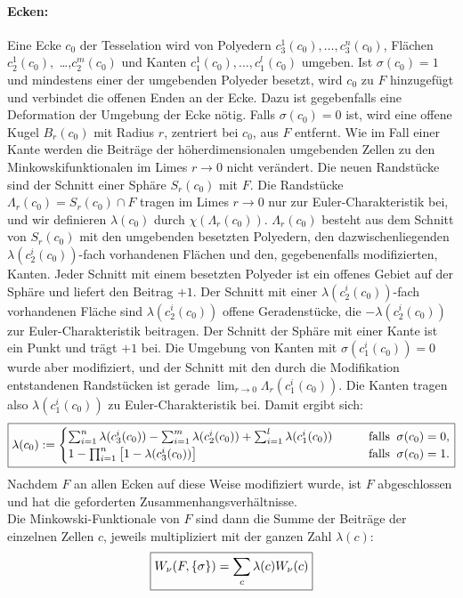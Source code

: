 \paragraph{Ecken:} Eine Ecke $c_0$ der Tesselation wird von Polyedern $c_3^1(c_0),\ldots,c_3^n(c_0)$, Fl\"achen $c_2^1(c_0),$ \ldots,$c_2^m(c_0)$ und Kanten $c_1^1(c_0),\ldots,c_1^l(c_0)$ umgeben. Ist $\sigma(c_0)=1$ und mindestens einer der umgebenden Polyeder besetzt, wird $c_0$ zu $F$ hinzugef\"ugt und verbindet die offenen Enden an der Ecke. Dazu ist gegebenfalls eine Deformation der Umgebung der Ecke n\"otig. Falls $\sigma(c_0)=0$ ist, wird eine offene Kugel $B_r(c_0)$ mit Radius $r$, zentriert bei $c_0$, aus $F$ entfernt. Wie im Fall einer Kante werden die Beitr\"age der h\"oherdimensionalen umgebenden Zellen zu den Minkowskifunktionalen im Limes $r\rightarrow 0$ nicht ver\"andert. Die neuen Randst\"ucke sind der Schnitt einer Sph\"are $S_r(c_0)$ mit $F$. Die Randst\"ucke $\Lambda_r(c_0)=S_r(c_0)\cap F$ tragen im Limes $r\rightarrow 0$ nur zur Euler-Charakteristik bei, und wir definieren $\lambda(c_0)$ durch $\chi(\Lambda_r(c_0))$. $\Lambda_r(c_0)$ besteht aus dem Schnitt von $S_r(c_0)$ mit den umgebenden besetzten Polyedern, den dazwischenliegenden $\lambda(c_2^i(c_0))$-fach vorhandenen Fl\"achen und den, gegebenenfalls modifizierten, Kanten. Jeder Schnitt mit einem besetzten Polyeder ist ein offenes Gebiet auf der Sph\"are und liefert den Beitrag $+1$. Der Schnitt mit einer $\lambda(c_2^i(c_0))$-fach vorhandenen Fl\"ache sind $\lambda(c_2^i(c_0))$ offene Geradenst\"ucke, die $-\lambda(c_2^i(c_0))$ zur Euler-Charakteristik beitragen. Der Schnitt der Sph\"are mit einer Kante ist ein Punkt und tr\"agt $+1$ bei. Die Umgebung von Kanten mit $\sigma(c_1^i(c_0))=0$ wurde aber modifiziert, und der Schnitt mit den durch die Modifikation entstandenen Randst\"ucken ist gerade $\lim_{r\rightarrow 0}\Lambda_r(c_1^i(c_0))$. Die Kanten tragen also $\lambda(c_1^i(c_0))$ zu Euler-Charakteristik bei. Damit ergibt sich: 
\begin{equation}
\label{eq:lambdaecken}
\fbox{$ \displaystyle 
  \lambda(c_0):= \begin{cases} \sum_{i=1}^n \lambda(c_3^i(c_0))-\sum_{i=1}^m\lambda(c_2^i(c_0))+\sum_{i=1}^l\lambda(c_1^i(c_0))\qquad & \text{falls} \;\; \sigma(c_0)=0, \\ 1-\prod_{i=1}^n\left[1-\lambda(c_3^i(c_0))\right] \qquad & \text{falls} \;\; \sigma(c_0)=1.
\end{cases}
$}
\end{equation}
Nachdem $F$ an allen Ecken auf diese Weise modifiziert wurde, ist $F$ abgeschlossen und hat die geforderten Zusammenhangsverh\"altnisse.
\\Die Minkowski-Funktionale von $F$ sind dann die Summe der Beitr\"age der einzelnen Zellen $c$, jeweils multipliziert mit der ganzen Zahl $\lambda(c)$:
\begin{equation}
\fbox{$\displaystyle
  W_{\nu}(F,\{\mathbf{\sigma}\})=\sum_{c}\lambda(c)W_{\nu}(c)
$}
\end{equation}

